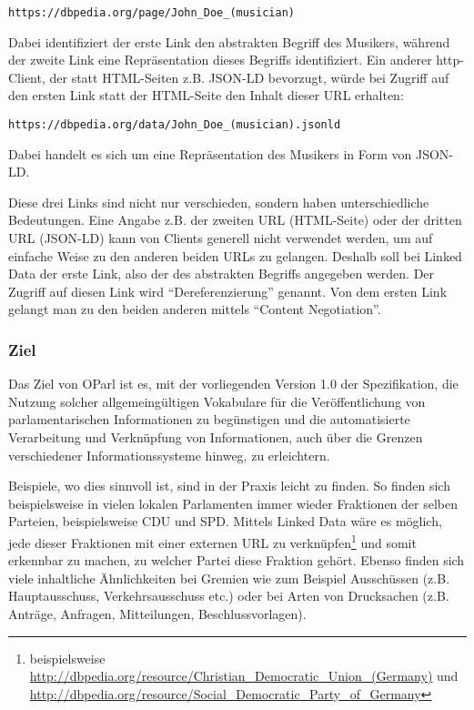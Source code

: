 \documentclass[,a4paper]{article}
\begin{document}
\begin{verbatim}
https://dbpedia.org/page/John_Doe_(musician)
\end{verbatim}

Dabei identifiziert der erste Link den abstrakten Begriff des Musikers,
während der zweite Link eine Repräsentation dieses Begriffs
identifiziert. Ein anderer http-Client, der statt HTML-Seiten z.B.
JSON-LD bevorzugt, würde bei Zugriff auf den ersten Link statt der
HTML-Seite den Inhalt dieser URL erhalten:

\begin{verbatim}
https://dbpedia.org/data/John_Doe_(musician).jsonld
\end{verbatim}

Dabei handelt es sich um eine Repräsentation des Musikers in Form von
JSON-LD.

Diese drei Links sind nicht nur verschieden, sondern haben
unterschiedliche Bedeutungen. Eine Angabe z.B. der zweiten URL
(HTML-Seite) oder der dritten URL (JSON-LD) kann von Clients generell
nicht verwendet werden, um auf einfache Weise zu den anderen beiden URLs
zu gelangen. Deshalb soll bei Linked Data der erste Link, also der des
abstrakten Begriffs angegeben werden. Der Zugriff auf diesen Link wird
``Dereferenzierung'' genannt. Von dem ersten Link gelangt man zu den
beiden anderen mittels ``Content Negotiation''.

\subsubsection{Ziel}\label{ziel}

Das Ziel von OParl ist es, mit der vorliegenden Version 1.0 der
Spezifikation, die Nutzung solcher allgemeingültigen Vokabulare für die
Veröffentlichung von parlamentarischen Informationen zu begünstigen und
die automatisierte Verarbeitung und Verknüpfung von Informationen, auch
über die Grenzen verschiedener Informationssysteme hinweg, zu
erleichtern.

Beispiele, wo dies sinnvoll ist, sind in der Praxis leicht zu finden. So
finden sich beispielsweise in vielen lokalen Parlamenten immer wieder
Fraktionen der selben Parteien, beispielsweise CDU und SPD. Mittels
Linked Data wäre es möglich, jede dieser Fraktionen mit einer externen
URL zu verknüpfen\footnote{beispielsweise
  \url{http://dbpedia.org/resource/Christian_Democratic_Union_(Germany)}
  und
  \url{http://dbpedia.org/resource/Social_Democratic_Party_of_Germany}}
und somit erkennbar zu machen, zu welcher Partei diese Fraktion gehört.
Ebenso finden sich viele inhaltliche Ähnlichkeiten bei Gremien wie zum
Beispiel Ausschüssen (z.B. Hauptausschuss, Verkehrsausschuss etc.) oder
bei Arten von Drucksachen (z.B. Anträge, Anfragen, Mitteilungen,
Beschlussvorlagen).
\end{document}
